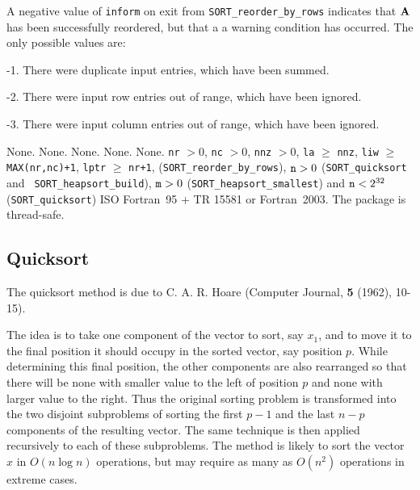\documentclass{galahad}
\newcommand{\packagename}{SORT}
\begin{document}
A negative value of {\tt inform} on exit from
{\tt \packagename\_reorder\_by\_rows} indicates
that ${\mathbf{A}}$ has been successfully reordered, but that a
a warning condition has occurred.
The only possible values are:

\begin{description}
\item{-1.} There were duplicate input entries, which have been summed.
\item{-2.} There were input row entries out of range, which have been ignored.
\item{-3.} There were input column entries out of range, which have been
ignored.
\end{description}


\galgeneral

\galcommon None.
\galworkspace None.
\galroutines None.
\galmodules None.
\galio None.
\galrestrictions
{\tt nr} $> 0$,
{\tt nc} $> 0$,
{\tt nnz} $> 0$,
{\tt la} $\geq$ {\tt nnz},
{\tt liw} $\geq$ {\tt MAX(nr,nc)+1},
{\tt lptr} $\geq$ {\tt nr+1},
({\tt \packagename\_reorder\_by\_rows}),
${\tt n} > 0$ ({\tt \packagename\_quicksort} and {\tt
\packagename\_heapsort\_build}),
${\tt m} > 0$ ({\tt \packagename\_heapsort\_smallest}) and
${\tt n} < 2^{32}$ \\ ({\tt \packagename\_quicksort})
\galportability ISO Fortran~95 + TR 15581 or Fortran~2003.
The package is thread-safe.


\galmethod

\subsection{Quicksort}

The quicksort method is due to C. A. R. Hoare (Computer Journal, {\bf 5 }
(1962), 10-15).

\noindent
The idea is to take one component of the vector to sort, say $x_1$, and to
move it to the final position it should occupy in the sorted vector, say
position $p$. While determining this final position, the other components are
also rearranged so that there will be none with smaller value to the left of
position $p$ and none with larger value to the right. Thus the original
sorting problem is transformed into the two disjoint subproblems of sorting the
first $p-1$ and the last $n-p$ components of the resulting vector. The same
technique is then applied recursively to each of these subproblems.
The method is likely to sort the vector $x$ in $O( n \log n )$ operations,
but may require as many as $O( n^2 )$ operations in extreme cases.
\end{document}
